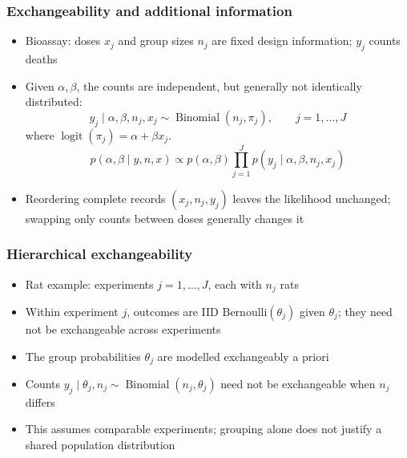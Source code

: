 \documentclass[10pt]{beamer}
\begin{document}
\begin{frame}

\frametitle{Exchangeability and additional information}

  \begin{itemize}
  \item Bioassay: doses $x_j$ and group sizes $n_j$ are fixed
    design information; $y_j$ counts deaths
  \item<2-> Given $\alpha,\beta$, the counts are independent, but
    generally not identically distributed:
    \[
      y_j\mid\alpha,\beta,n_j,x_j\sim\operatorname{Binomial}(n_j,\pi_j),
      \qquad j=1,\ldots,J
    \]
    where $\operatorname{logit}(\pi_j)=\alpha+\beta x_j$.
    \[
      p(\alpha,\beta\mid y,n,x)\propto p(\alpha,\beta)
        \prod_{j=1}^J p(y_j\mid\alpha,\beta,n_j,x_j)
    \]
  \item<3-> Reordering complete records $(x_j,n_j,y_j)$ leaves the
    likelihood unchanged; swapping only counts between doses
    generally changes it
  \end{itemize}
\end{frame}

\begin{frame}

\frametitle{Hierarchical exchangeability}

  \begin{itemize}
  \item Rat example: experiments $j=1,\ldots,J$, each with $n_j$ rats
  \item<2-> Within experiment $j$, outcomes are IID
    Bernoulli$(\theta_j)$ given $\theta_j$; they need not be
    exchangeable across experiments
  \item<3-> The group probabilities $\theta_j$ are modelled
    exchangeably a priori
  \item<4-> Counts $y_j\mid\theta_j,n_j\sim\operatorname{Binomial}(n_j,\theta_j)$
    need not be exchangeable when $n_j$ differs
  \item<4-> This assumes comparable experiments; grouping alone
    does not justify a shared population distribution
  \end{itemize}
\end{frame}
\end{document}
